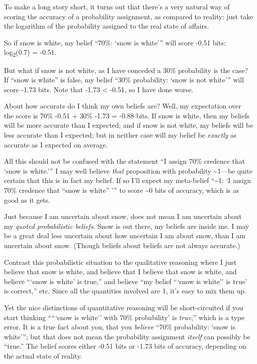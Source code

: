 {
 To make a long story short, it turns out that
there's a very natural way of scoring the accuracy of a
probability assignment, as compared to reality: just take the logarithm
of the probability assigned to the real state of affairs.}

{
 So if snow is white, my belief ``70\%:
`snow is white''' will
score -0.51 bits: log\textsubscript{2}(0.7) = -0.51.}

{
 But what if snow is not white, as I have conceded a 30\%
probability is the case? If ``snow is
white'' is false, my belief ``30\%
probability: `snow is not
white''' will score -1.73 bits. Note
that -1.73 {\textless} -0.51, so I have done worse.}

{
 About how accurate do I think my own beliefs are? Well, my
expectation over the score is 70\% {\texttimes} -0.51 + 30\%
{\texttimes} -1.73 = -0.88 bits. If snow is white, then my beliefs will
be more accurate than I expected; and if snow is not white, my beliefs
will be less accurate than I expected; but in neither case will my
belief be \textit{exactly} as accurate as I expected on average.}

{
 All this should not be confused with the statement
``I assign 70\% credence that `snow is
white.''' I may well believe
\textit{that} proposition with probability \~{}1---be quite certain
that this is in fact my belief. If so I'll expect my
meta-belief ``\~{}1: `I assign 70\%
credence that ``snow is white''
''' to score \~{}0 bits of accuracy,
which is as good as it gets.}

{
 Just because I am uncertain about snow, does not mean I am
uncertain about my \textit{quoted probabilistic beliefs}. Snow is out
there, my beliefs are inside me. I may be a great deal less uncertain
about how uncertain I am about snow, than I am uncertain about snow.
(Though beliefs about beliefs are not always accurate.)}

{
 Contrast this probabilistic situation to the qualitative reasoning
where I just believe that snow is white, and believe that I believe
that snow is white, and believe ```snow
is white' is true,'' and believe
``my belief ```snow is
white'' is true' is
correct,'' etc. Since all the quantities involved are
1, it's easy to mix them up.}

{
 Yet the nice distinctions of quantitative reasoning will be
short-circuited if you start thinking
`````snow is
white'' with 70\% probability' is
\textit{true},'' which is a type error. It is a true
fact about you, that you \textit{believe} ``70\%
probability: `snow is
white'''; but that does not mean the
probability assignment \textit{itself} can possibly be
``true.'' The belief scores either
-0.51 bits or -1.73 bits of accuracy, depending on the actual state of
reality.}

